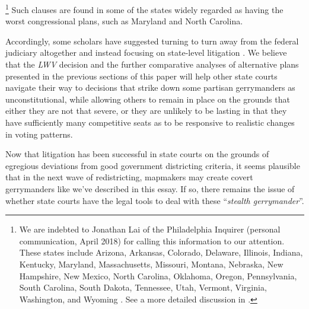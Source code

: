         \footnote{We are indebted to Jonathan Lai of the Philadelphia Inquirer (personal communication, April 2018) for calling this information to our attention. These states include Arizona, Arkansas, Colorado, Delaware, Illinois, Indiana, Kentucky, Maryland, Massachusetts, Missouri, Montana, Nebraska, New Hampshire, New Mexico, North Carolina, Oklahoma, Oregon, Pennsylvania, South Carolina, South Dakota, Tennessee, Utah, Vermont, Virginia, Washington, and Wyoming \citep[][footnote 86]{Douglas2014_RightToVote}. See a more detailed discussion in \citet{Elmendorf2018}.}
    Such clauses are found in some of the states widely regarded as having the worst congressional plans, such as Maryland and North Carolina.
\par
    Accordingly, some scholars have suggested turning to turn away from the federal judiciary altogether and instead focusing on state-level litigation \citep{Wang_et_al_2019_Labortories_UPJCL}. We believe that the \textit{LWV} decision and the further comparative analyses of alternative plans presented in the previous sections of this paper will help other state courts navigate their way to decisions that strike down some partisan gerrymanders as unconstitutional, while allowing others to remain in place on the grounds that either they are not that severe, or they are unlikely to be lasting in that they have sufficiently many competitive seats as to be responsive to realistic changes in voting patterns. 
\par    
    Now that litigation has been successful in state courts on the grounds of egregious deviations from good government districting criteria, it seems plausible that in the next wave of redistricting, mapmakers may create covert gerrymanders like we've described in this essay. If so, there remains the issue of whether state courts have the legal tools to deal with these ``\textit{stealth gerrymander}”.
